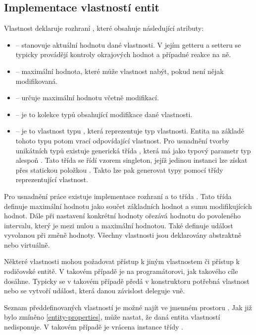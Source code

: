 \subsection{Implementace vlastností entit}

Vlastnost deklaruje rozhraní , které obsahuje následující atributy:
\begin{itemize}
\item {} -- stanovuje aktuální hodnotu dané vlastnosti. V jejím getteru a setteru se typicky provádějí 
	kontroly okrajových hodnot a případné reakce na ně.
\item {} -- maximální hodnota, které může vlastnost nabýt, pokud není nějak modifikovaná.
\item {} -- určuje maximální hodnotu včetně modifikací. 
\item {} -- je to kolekce typů  obsahující modifikace dané vlastnosti.
\item {} -- je to vlastnost typu , která reprezentuje typ vlastnosti. Entita na základě 
	tohoto typu potom vrací odpovídající vlastnost. Pro usnadnění tvorby unikátních typů existuje generická třída , 
	která má jako typový parametr typ alespoň . Tato třída se řídí vzorem singleton, jejíž jedinou instanci
	lze získat přes statickou položkou . Takto lze pak generovat typy pomocí třídy reprezentující vlastnost.
\end{itemize}

Pro usnadnění práce existuje implementace rozhraní  a to třída . Tato třída definuje 
maximální hodnotu jako součet základních hodnot a sumu modifikujících hodnot. Dále při nastavení konkrétní hodnoty ořezává
hodnotu do povoleného intervalu, který je mezi nulou a maximální hodnotou. Také definuje událost vyvolanou při změně hodnoty.
Všechny vlastnosti jsou deklarovány abstraktně nebo virtuálně. 

Některé vlastnosti mohou požadovat přístup k jiným vlastnostem či přístup k rodičovské entitě. V takovém
případě je na programátorovi, jak takového cíle dosáhne. Typicky se v takovém případě předá v konstruktoru
potřebná vlastnost nebo se vytvoří událost, která danou závislost deleguje vně. 

Seznam předdefinovaných vlastností je možné najít ve jmenném prostoru .
Jak již bylo zmíněno \vref{entity-properties}, může nastat, že daná entita vlastností nedisponuje. V takovém případě 
je vrácena instance třídy . 

